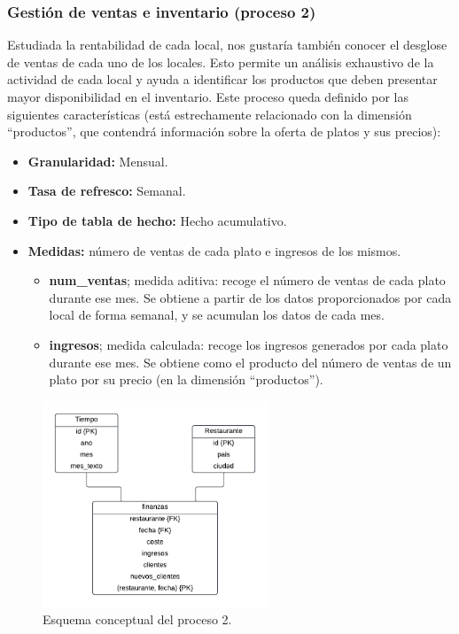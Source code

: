 \documentclass[12pt]{opticajnl}
\begin{document}
\subsubsection{Gestión de ventas e inventario (proceso 2)}

Estudiada la rentabilidad de cada local, nos gustaría también conocer el desglose de ventas de cada uno de los locales. Esto permite un análisis exhaustivo de la actividad de cada local y ayuda a identificar los productos que deben presentar mayor disponibilidad en el inventario. Este proceso queda definido por las siguientes características (está estrechamente relacionado con la dimensión ``productos'', que contendrá información sobre la oferta de platos y sus precios):
\begin{itemize}
\item \textbf{Granularidad:} Mensual.
\item \textbf{Tasa de refresco:} Semanal.
\item \textbf{Tipo de tabla de hecho:} Hecho acumulativo.
\item \textbf{Medidas:} número de ventas de cada plato e ingresos de los mismos.
\begin{itemize}
\item \textbf{num\_ventas}; medida aditiva: recoge el número de ventas de cada plato durante ese mes. Se obtiene a partir de los datos proporcionados por cada local de forma semanal, y se acumulan los datos de cada mes.
\item \textbf{ingresos}; medida calculada: recoge los ingresos generados por cada plato durante ese mes. Se obtiene como el producto del número de ventas de un plato por su precio (en la dimensión ``productos'').
\end{itemize}
\end{itemize}

\begin{figure}[h]
\centering
\includegraphics[width=0.6\textwidth]{fotos/prods.pdf}
\caption{Esquema conceptual del proceso 2.}
\label{fig:esquema_proceso2}
\end{figure}
\end{document}
